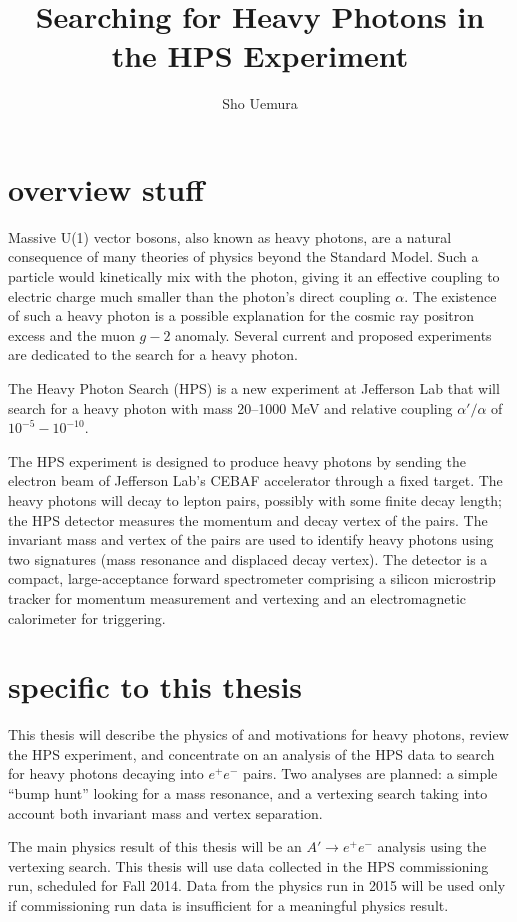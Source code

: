 \documentclass[12pt,letterpaper]{article}
\author{Sho Uemura}
\title{Searching for Heavy Photons in the HPS Experiment}
\date{}
\begin{document}
\maketitle

\section*{overview stuff}
Massive U(1) vector bosons, also known as heavy photons, are a natural consequence of many theories of physics beyond the Standard Model. Such a particle would kinetically mix with the photon, giving it an effective coupling to electric charge much smaller than the photon's direct coupling $\alpha$. The existence of such a heavy photon is a possible explanation for the cosmic ray positron excess and the muon $g-2$ anomaly. Several current and proposed experiments are dedicated to the search for a heavy photon.

The Heavy Photon Search (HPS) is a new experiment at Jefferson Lab that will search for a heavy photon with mass 20--1000 MeV and relative coupling $\alpha'/\alpha$ of $10^{-5}-10^{-10}$. 

The HPS experiment is designed to produce heavy photons by sending the electron beam of Jefferson Lab's CEBAF accelerator through a fixed target.
The heavy photons will decay to lepton pairs, possibly with some finite decay length; the HPS detector measures the momentum and decay vertex of the pairs.
The invariant mass and vertex of the pairs are used to identify heavy photons using two signatures (mass resonance and displaced decay vertex).
The detector is a compact, large-acceptance forward spectrometer comprising a silicon microstrip tracker for momentum measurement and vertexing and an electromagnetic calorimeter for triggering.

\section*{specific to this thesis}
This thesis will describe the physics of and motivations for heavy photons, review the HPS experiment, and concentrate on an analysis of the HPS data to search for heavy photons decaying into $e^+e^-$ pairs.
Two analyses are planned: a simple ``bump hunt'' looking for a mass resonance, and a vertexing search taking into account both invariant mass and vertex separation.

The main physics result of this thesis will be an $A'\to e^+e^-$ analysis using the vertexing search.
This thesis will use data collected in the HPS commissioning run, scheduled for Fall 2014.
Data from the physics run in 2015 will be used only if commissioning run data is insufficient for a meaningful physics result.


\end{document}
